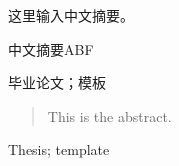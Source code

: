 

\begin{zhaiyao}

这里输入中文摘要。
\newpage

中文摘要ABF
\end{zhaiyao}




\begin{guanjianci}
毕业论文；模板
\end{guanjianci}



\begin{abstract}


This is the abstract.

\end{abstract}



\begin{keywords}
Thesis; template
\end{keywords} 
